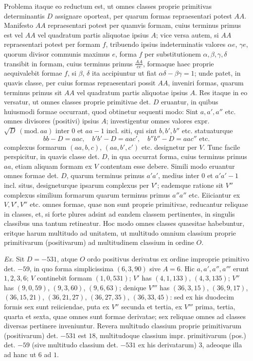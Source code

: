 Problema itaque eo reductum est, ut omnes classes proprie primitivas determinantis \(D\) assignare oporteat, per quarum formas repraesentari potest \(AA\). Manifesto \(AA\) repraesentari potest per quamvis formam, cuius terminus primus est vel \(AA\) vel quadratum partis aliquotae ipsius \(A\); vice versa autem, si \(AA\) repraesentari potest per formam \(f\), tribuendo ipsius indeterminatis valores \(\alpha e\), \(\gamma e\), quorum divisor communis maximus \(e\), forma \(f\) per substitutionem \(\alpha,\beta,\gamma,\delta\) transibit in formam, cuius terminus primus \(\frac{AA}{ee}\), formaque haec proprie aequivalebit formae \(f\), si \(\beta\), \(\delta\) ita accipiuntur ut fiat \(\alpha\delta-\beta\gamma=1\); unde patet, in quavis classe, per cuius formas repraesentari possit \(AA\), inveniri formas, quarum terminus primus sit \(AA\) vel quadratum partis aliquotae ipsius \(A\). Res itaque in eo versatur, ut omnes classes proprie primitivae det. \(D\) eruantur, in quibus huiusmodi formae occurrant, quod obtinetur sequenti modo: Sint \(a,a',a''\) etc. omnes divisores (positivi) ipsius \(A\); investigentur omnes valores expr. \(\surd D\ (\mathrm{mod.}\,aa)\) inter \(0\) et \(aa-1\) incl. siti, qui sint \(b,b',b''\) etc. statuaturque
\[
bb-D=aac,\quad b'b'-D=aac',\quad b''b''-D=aac''\text{ etc.}
\]
complexus formarum \((aa,b,c)\), \((aa,b',c')\) etc. designetur per \(V\). Tunc facile perspicitur, in quavis classe det. \(D\), in qua occurrat forma, cuius terminus primus \(aa\), etiam aliquam formam ex \(V\) contentam esse debere. Simili modo eruantur omnes formae det. \(D\), quarum terminus primus \(a'a'\), medius inter \(0\) et \(a'a'-1\) incl. situs, designeturque ipsarum complexus per \(V'\); eademque ratione sit \(V''\)
complexus similium formarum quarum terminus primus \(a''a''\) etc. Eiiciantur ex \(V,V',V''\) etc. omnes formae, quae non sunt proprie primitivae, reducantur reliquae in classes, et, si forte plures adsint ad eandem classem pertinentes, in singulis classibus una tantum retineatur. Hoc modo omnes classes quaesitae habebuntur, eritque harum multitudo ad unitatem, ut multitudo omnium classium proprie primitivarum (positivarum) ad multitudinem classium in ordine \(O\).

\textit{Ex.} Sit \(D=-531\), atque \(O\) ordo positivus derivatus ex ordine improprie primitivo det. \(-59\), in quo forma simplicissima \((6,3,90)\) sive \(A=6\). Hic \(a,a',a'',a'''\) erunt \(1,2,3,6\); \(V\) continebit formam \((1,0,531)\); \(V'\) has \((4,1,133)\), \((4,3,135)\); \(V''\) has \((9,0,59)\), \((9,3,60)\), \((9,6,63)\); denique \(V'''\) has \((36,3,15)\), \((36,9,17)\), \((36,15,21)\), \((36,21,27)\), \((36,27,35)\), \((36,33,45)\): sed ex his duodecim formis sex sunt reiiciendae, puta ex \(V''\) secunda et tertia, ex \(V'''\) prima, tertia, quarta et sexta, quae omnes sunt formae derivatae; sex reliquae omnes ad classes diversas pertinere inveniuntur. Revera multitudo classium proprie primitivarum (positivarum) det. \(-531\) est \(18\), multitudoque classium impr. primitivarum (pos.) det. \(-59\) (sive multitudo classium det. \(-531\) ex his derivatarum) \(3\), adeoque illa ad hanc ut \(6\) ad \(1\).

